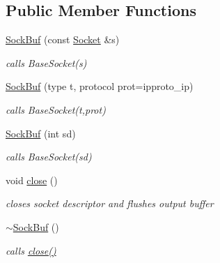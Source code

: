 \subsection*{Public Member Functions}
\begin{CompactItemize}
\item 
\hypertarget{classsocketpp_1_1SockBuf_065ef76cdf18c04857350c643bd620e3}{
\hyperlink{classsocketpp_1_1SockBuf_065ef76cdf18c04857350c643bd620e3}{SockBuf} (const \hyperlink{classsocketpp_1_1Socket}{Socket} \&s)}
\label{classsocketpp_1_1SockBuf_065ef76cdf18c04857350c643bd620e3}

\begin{CompactList}\small\item\em calls BaseSocket(s) \item\end{CompactList}\item 
\hypertarget{classsocketpp_1_1SockBuf_5e8a5860fd67228e5d39ea28f9d67341}{
\hyperlink{classsocketpp_1_1SockBuf_5e8a5860fd67228e5d39ea28f9d67341}{SockBuf} (type t, protocol prot=ipproto\_\-ip)}
\label{classsocketpp_1_1SockBuf_5e8a5860fd67228e5d39ea28f9d67341}

\begin{CompactList}\small\item\em calls BaseSocket(t,prot) \item\end{CompactList}\item 
\hypertarget{classsocketpp_1_1SockBuf_71bbd8cf2bd9dd79b8067b0ef771bf23}{
\hyperlink{classsocketpp_1_1SockBuf_71bbd8cf2bd9dd79b8067b0ef771bf23}{SockBuf} (int sd)}
\label{classsocketpp_1_1SockBuf_71bbd8cf2bd9dd79b8067b0ef771bf23}

\begin{CompactList}\small\item\em calls BaseSocket(sd) \item\end{CompactList}\item 
\hypertarget{classsocketpp_1_1SockBuf_28f88c6ac0570ee5e9d57e255733b0f9}{
void \hyperlink{classsocketpp_1_1SockBuf_28f88c6ac0570ee5e9d57e255733b0f9}{close} ()}
\label{classsocketpp_1_1SockBuf_28f88c6ac0570ee5e9d57e255733b0f9}

\begin{CompactList}\small\item\em closes socket descriptor and flushes output buffer \item\end{CompactList}\item 
\hypertarget{classsocketpp_1_1SockBuf_ee857faaed622effa453c7b53749ff14}{
\hyperlink{classsocketpp_1_1SockBuf_ee857faaed622effa453c7b53749ff14}{$\sim$SockBuf} ()}
\label{classsocketpp_1_1SockBuf_ee857faaed622effa453c7b53749ff14}

\begin{CompactList}\small\item\em calls \hyperlink{classsocketpp_1_1SockBuf_28f88c6ac0570ee5e9d57e255733b0f9}{close()} \item\end{CompactList}\end{CompactItemize}
